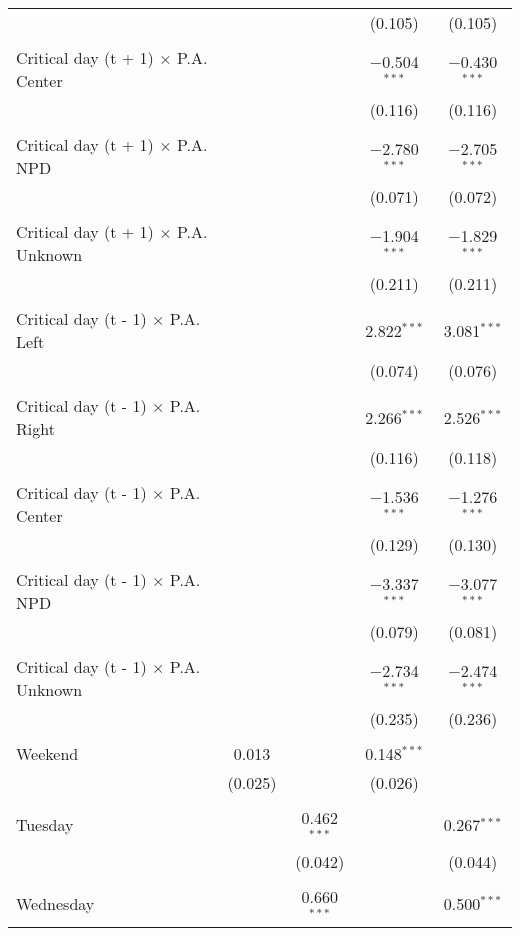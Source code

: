 \documentclass[
]{article}
\begin{document}
\begin{table}[!htbp]
{\begin{tabular}{@{\extracolsep{5pt}}lcccc}
  &  &  & (0.105) & (0.105) \\ 
  & & & & \\ 
 Critical day (t + 1) $\times$ P.A. Center &  &  & $-$0.504$^{***}$ & $-$0.430$^{***}$ \\ 
  &  &  & (0.116) & (0.116) \\ 
  & & & & \\ 
 Critical day (t + 1) $\times$ P.A. NPD &  &  & $-$2.780$^{***}$ & $-$2.705$^{***}$ \\ 
  &  &  & (0.071) & (0.072) \\ 
  & & & & \\ 
 Critical day (t + 1) $\times$ P.A. Unknown &  &  & $-$1.904$^{***}$ & $-$1.829$^{***}$ \\ 
  &  &  & (0.211) & (0.211) \\ 
  & & & & \\ 
 Critical day (t - 1) $\times$ P.A. Left &  &  & 2.822$^{***}$ & 3.081$^{***}$ \\ 
  &  &  & (0.074) & (0.076) \\ 
  & & & & \\ 
 Critical day (t - 1) $\times$ P.A. Right &  &  & 2.266$^{***}$ & 2.526$^{***}$ \\ 
  &  &  & (0.116) & (0.118) \\ 
  & & & & \\ 
 Critical day (t - 1) $\times$ P.A. Center &  &  & $-$1.536$^{***}$ & $-$1.276$^{***}$ \\ 
  &  &  & (0.129) & (0.130) \\ 
  & & & & \\ 
 Critical day (t - 1) $\times$ P.A. NPD &  &  & $-$3.337$^{***}$ & $-$3.077$^{***}$ \\ 
  &  &  & (0.079) & (0.081) \\ 
  & & & & \\ 
 Critical day (t - 1) $\times$ P.A. Unknown &  &  & $-$2.734$^{***}$ & $-$2.474$^{***}$ \\ 
  &  &  & (0.235) & (0.236) \\ 
  & & & & \\ 
 Weekend & 0.013 &  & 0.148$^{***}$ &  \\ 
  & (0.025) &  & (0.026) &  \\ 
  & & & & \\ 
 Tuesday &  & 0.462$^{***}$ &  & 0.267$^{***}$ \\ 
  &  & (0.042) &  & (0.044) \\ 
  & & & & \\ 
 Wednesday &  & 0.660$^{***}$ &  & 0.500$^{***}$ \\ 

\end{tabular}}
\end{table}
\end{document}
